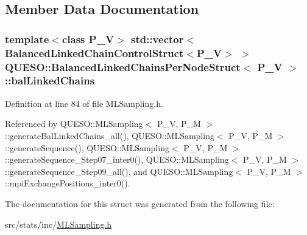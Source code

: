 \subsection{Member Data Documentation}
\hypertarget{struct_q_u_e_s_o_1_1_balanced_linked_chains_per_node_struct_ad8a7fce965f7c04bdd0968a94e6e819c}{
\subsubsection[{bal\-Linked\-Chains}]{\setlength{\rightskip}{0pt plus 5cm}template$<$class P\-\_\-\-V$>$ std\-::vector$<${\bf Balanced\-Linked\-Chain\-Control\-Struct}$<$P\-\_\-\-V$>$ $>$ {\bf Q\-U\-E\-S\-O\-::\-Balanced\-Linked\-Chains\-Per\-Node\-Struct}$<$ P\-\_\-\-V $>$\-::bal\-Linked\-Chains}}\label{struct_q_u_e_s_o_1_1_balanced_linked_chains_per_node_struct_ad8a7fce965f7c04bdd0968a94e6e819c}


Definition at line 84 of file M\-L\-Sampling.\-h.



Referenced by Q\-U\-E\-S\-O\-::\-M\-L\-Sampling$<$ P\-\_\-\-V, P\-\_\-\-M $>$\-::generate\-Bal\-Linked\-Chains\-\_\-all(), Q\-U\-E\-S\-O\-::\-M\-L\-Sampling$<$ P\-\_\-\-V, P\-\_\-\-M $>$\-::generate\-Sequence(), Q\-U\-E\-S\-O\-::\-M\-L\-Sampling$<$ P\-\_\-\-V, P\-\_\-\-M $>$\-::generate\-Sequence\-\_\-\-Step07\-\_\-inter0(), Q\-U\-E\-S\-O\-::\-M\-L\-Sampling$<$ P\-\_\-\-V, P\-\_\-\-M $>$\-::generate\-Sequence\-\_\-\-Step09\-\_\-all(), and Q\-U\-E\-S\-O\-::\-M\-L\-Sampling$<$ P\-\_\-\-V, P\-\_\-\-M $>$\-::mpi\-Exchange\-Positions\-\_\-inter0().



The documentation for this struct was generated from the following file\-:\begin{DoxyCompactItemize}
\item 
src/stats/inc/\hyperlink{_m_l_sampling_8h}{M\-L\-Sampling.\-h}\end{DoxyCompactItemize}
